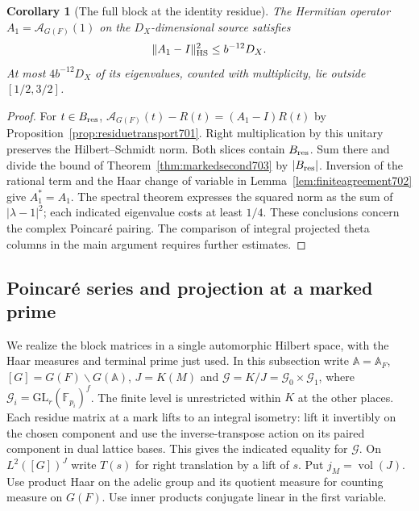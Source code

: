 \documentclass[a4paper,11pt]{article}
\newtheorem{corollary}[proposition]{Corollary}
\theoremstyle{definition}
\theoremstyle{remark}
\numberwithin{equation}{section}
\begin{document}
\begin{corollary}[The full block at the identity residue]\leavevmode
\label{cor:identityblock703}
The Hermitian operator \(A_1=\mathcal A_{G(F)}(1)\) on the
\(D_X\)-dimensional source satisfies
\[
        \|A_1-I\|_{\rm HS}^2\le b^{-12}D_X .
\]
At most \(4b^{-12}D_X\) of its eigenvalues, counted with
multiplicity, lie outside \([1/2,3/2]\).
\end{corollary}
\begin{proof}
For \(t\in B_{\rm res}\),
\(\mathcal A_{G(F)}(t)-R(t)=(A_1-I)R(t)\) by
Proposition~\ref{prop:residuetransport701}. Right multiplication
by this unitary preserves the Hilbert--Schmidt norm. Both
slices contain \(B_{\rm res}\). Sum there and divide the bound
of Theorem~\ref{thm:markedsecond703} by \(|B_{\rm res}|\).
Inversion of the rational term and the Haar change of variable
in Lemma~\ref{lem:finiteagreement702} give \(A_1^*=A_1\).
The spectral theorem expresses the squared norm as the sum
of \(|\lambda-1|^2\); each indicated eigenvalue costs at
least \(1/4\). These conclusions concern the complex
Poincar\'e pairing. The comparison of integral projected
theta columns in the main argument requires further estimates.
\end{proof}


\subsection{Poincar\'e series and projection at a marked prime}
\label{sec:poincareprojection704}

We realize the block matrices in a single automorphic Hilbert
space, with the Haar measures and terminal prime just used.
In this subsection write \(\mathbb A=\mathbb A_F\),
\([G]=G(F)\backslash G(\mathbb A)\), \(J=K(M)\) and
\(\mathcal G=K/J=\mathcal G_0\times\mathcal G_1\), where
\(\mathcal G_i=\mathrm{GL}_r(\mathbb F_{p_i})^f\).
The finite level is unrestricted within \(K\) at the other
places. Each residue matrix at a mark lifts to an integral
isometry: lift it invertibly on the chosen component and
use the inverse-transpose action on its paired component in
dual lattice bases. This gives the indicated equality for
\(\mathcal G\). On \(L^2([G])^J\) write \(T(s)\) for right
translation by a lift of \(s\). Put \(j_M=\operatorname{vol}(J)\).
Use product Haar on the adelic group and its quotient measure
for counting measure on \(G(F)\). Use inner products conjugate
linear in the first variable.
\end{document}
